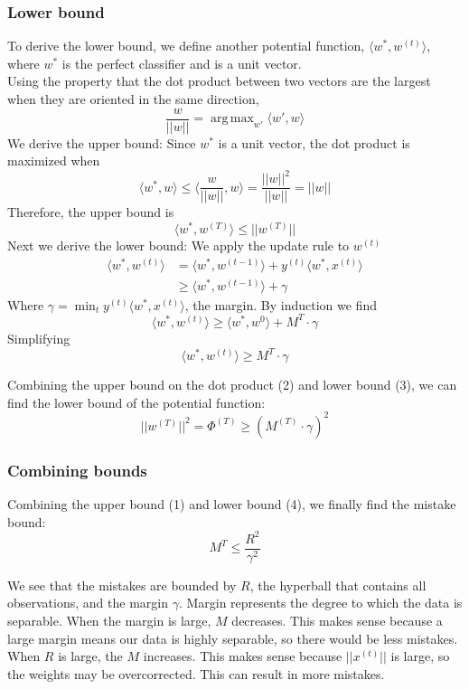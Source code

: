 \documentclass[11pt]{article}
\DeclareMathOperator*{\argmax}{arg\,max}
\begin{document}
\subsubsection{Lower bound}
To derive the lower bound, we define another potential function, $\langle w^*, w^{(t)}\rangle$, where $w^*$ is the perfect classifier and is a unit vector.\\
Using the property that the dot product between two vectors are the largest when they are oriented in the same direction, 
$$\frac{w}{||w||} = \argmax_{w'}\langle w', w\rangle$$
We derive the upper bound:
Since $w^*$ is a unit vector, the dot product is maximized when
$$\langle w^*, w\rangle \leq \langle \frac{w}{||w||}, w\rangle = \frac{||w||^2}{||w||} = ||w||$$
Therefore, the upper bound is
\begin{equation}
    \boxed{\langle w^*, w^{(T)}\rangle \leq ||w^{(T)}||}
\end{equation}
Next we derive the lower bound:
We apply the update rule to $w^{(t)}$
\begin{align*}
    \langle w^*, w^{(t)}\rangle &= \langle w^*, w^{(t-1)}\rangle + y^{(t)}\langle w^*, x^{(t)}\rangle\\
    &\geq \langle w^*, w^{(t-1)}\rangle + \gamma
\end{align*}
Where $\gamma = \min_t y^{(t)}\langle w^*, x^{(t)}\rangle$, the margin. 
By induction we find
$$\langle w^*, w^{(t)}\rangle \geq \langle w^*, w^{0}\rangle + M^T\cdot \gamma$$
Simplifying
\begin{equation}
    \boxed{\langle w^*, w^{(t)}\rangle \geq M^T\cdot \gamma}
\end{equation}


Combining the upper bound on the dot product (2) and lower bound (3), we can find the lower bound of the potential function:
\begin{equation}
    \boxed{||w^{(T)}||^2 = \Phi^{(T)} \geq (M^{(T)}\cdot \gamma)^2}
\end{equation}


\subsubsection{Combining bounds}
Combining the upper bound (1) and lower bound (4), we finally find the mistake bound:
\begin{equation}
    \boxed{M^T \leq \frac{R^2}{\gamma^2}}
\end{equation}

We see that the mistakes are bounded by $R$, the hyperball that contains all observations, and the margin $\gamma$. Margin represents the degree to which the data is separable. When the margin is large, $M$ decreases. This makes sense because a large margin means our data is highly separable, so there would be less mistakes. When $R$ is large, the $M$ increases. This makes sense because $||x^{(t)}||$ is large, so the weights may be overcorrected. This can result in more mistakes. 
\end{document}
